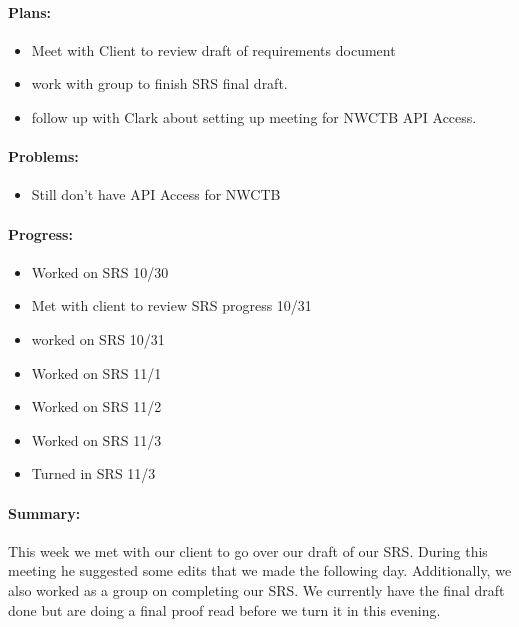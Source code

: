 \documentclass[onecolumn, draftclsnofoot,10pt, compsoc]{article}
\begin{document}
		    \paragraph{Plans:} \hfill \break
		        
		        \begin{itemize}
		            \item Meet with Client to review draft of requirements document
		            \item work with group to finish SRS final draft.
		            \item follow up with Clark about setting up meeting for NWCTB API Access.
		        \end{itemize}
		
		    \paragraph{Problems:} \hfill \break
		        
		        \begin{itemize}
		            \item Still don't have API Access for NWCTB
		        \end{itemize}
		        
		    \paragraph{Progress:} \hfill \break
		    
		        \begin{itemize}
		            \item Worked on SRS 10/30
		            \item Met with client to review SRS progress 10/31
		            \item worked on SRS 10/31
		            \item Worked on SRS 11/1
		            \item Worked on SRS 11/2
		            \item Worked on SRS 11/3
		            \item Turned in SRS 11/3
		        \end{itemize}
		
		    \paragraph{Summary:} \hfill \break
		        This week we met with our client to go over our draft of our SRS. During this meeting he suggested some edits that we made the following day. Additionally, we also worked as a group on completing our SRS. We currently have the final draft done but are doing a final proof read before we turn it in this evening.\\
		
\end{document}
